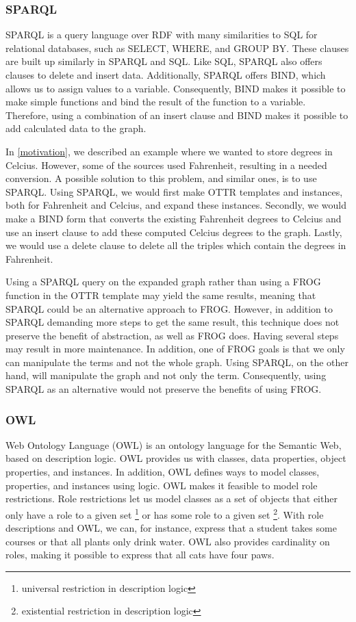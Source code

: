 \subsubsection{SPARQL}
SPARQL \autocite{SPARQL} is a query language over RDF with many similarities to SQL for relational databases, such as SELECT, WHERE, and GROUP BY. These clauses are built up similarly in SPARQL and SQL. Like SQL, SPARQL also offers clauses to delete and insert data. Additionally, SPARQL offers BIND, which allows us to assign values to a variable. Consequently, BIND makes it possible to make simple functions and bind the result of the function to a variable. Therefore, using a combination of an insert clause and BIND makes it possible to add calculated data to the graph.

\para
In \autoref{motivation}, we described an example where we wanted to store degrees in Celcius. However, some of the sources used Fahrenheit, resulting in a needed conversion. A possible solution to this problem, and similar ones, is to use SPARQL. Using SPARQL, we would first make OTTR templates and instances, both for Fahrenheit and Celcius, and expand these instances. Secondly, we would make a BIND form that converts the existing Fahrenheit degrees to Celcius and use an insert clause to add these computed Celcius degrees to the graph. Lastly, we would use a delete clause to delete all the triples which contain the degrees in Fahrenheit.

\para
Using a SPARQL query on the expanded graph rather than using a FROG function in the OTTR template may yield the same results, meaning that SPARQL could be an alternative approach to FROG. However, in addition to SPARQL demanding more steps to get the same result, this technique does not preserve the benefit of abstraction, as well as FROG does. Having several steps may result in more maintenance. In addition, one of FROG goals is that we only can manipulate the terms and not the whole graph. Using SPARQL, on the other hand, will manipulate the graph and not only the term. Consequently, using SPARQL as an alternative would not preserve the benefits of using FROG.

\subsubsection{OWL}
Web Ontology Language (OWL) \autocite{OWL} is an ontology language for the Semantic Web, based on description logic. OWL provides us with classes, data properties, object properties, and instances. In addition, OWL defines ways to model classes, properties, and instances using logic. OWL makes it feasible to model role restrictions. Role restrictions let us model classes as a set of objects that either only have a role to a given set \footnote{universal restriction in description logic} or has some role to a given set \footnote{existential restriction in description logic}.  With role descriptions and OWL, we can, for instance, express that a student takes some courses or that all plants only drink water. OWL also provides cardinality on roles, making it possible to express that all cats have four paws.


